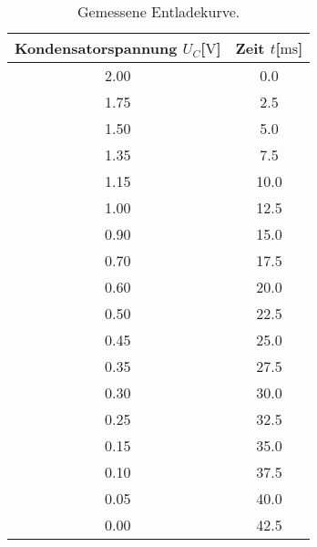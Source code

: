    \begin{table}
        \centering
        \caption{Gemessene Entladekurve.}
        \label{tab:entladen}
        \begin{tabular}{c c}
            \toprule
            Kondensatorspannung $U_{C}$[$\si{\volt}$] & Zeit $t$[$\si{\milli\second}$] \\
            \midrule
            2.00    &   0.0\\   
            1.75    &   2.5\\  
            1.50    &   5.0\\
            1.35    &   7.5\\  
            1.15    &   10.0\\
            1.00    &   12.5\\
            0.90    &   15.0\\
            0.70    &   17.5\\
            0.60    &   20.0\\
            0.50    &   22.5\\
            0.45    &   25.0\\
            0.35    &   27.5\\
            0.30    &   30.0\\
            0.25    &   32.5\\  
            0.15    &   35.0\\
            0.10    &   37.5\\
            0.05    &   40.0\\
            0.00    &   42.5\\
            \bottomrule
        \end{tabular}
        \end{table}

